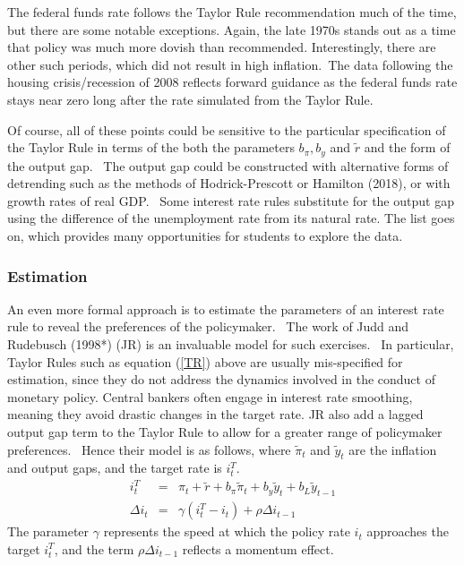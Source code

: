 \documentclass{article}
\begin{document}
\begin{doublespace}
The federal funds rate follows the Taylor Rule recommendation much of the
time, but there are some notable exceptions. Again, the late 1970s stands
out as a time that policy was much more dovish than recommended.
Interestingly, there are other such periods, which did not result in high
inflation.\ The data following the housing crisis/recession of 2008 reflects
forward guidance as the federal funds rate stays near zero long after the
rate simulated from the Taylor Rule. \ 

Of course, all of these points could be sensitive to the particular
specification of the Taylor Rule in terms of the both the parameters $b_{\pi
},b_{y}$ and $\widetilde{r}$ and the form of the output gap. \ The output
gap could be constructed with alternative forms of detrending such as the
methods of Hodrick-Prescott or Hamilton (2018), or with growth rates of real
GDP. \ Some interest rate rules substitute for the output gap using the
difference of the unemployment rate from its natural rate. The list goes on,
which provides many opportunities for students to explore the data.

\subsubsection{Estimation}

An even more formal approach is to estimate the parameters of an interest
rate rule to reveal the preferences of the policymaker. \ The work of Judd
and Rudebusch (1998*) (JR) is an invaluable model for such exercises. \ In
particular, Taylor Rules such as equation (\ref{TR}) above are usually
mis-specified for estimation, since they do not address the dynamics
involved in the conduct of monetary policy. Central bankers often engage in
interest rate smoothing, meaning they avoid drastic changes in the target
rate. JR also add a lagged output gap term to the Taylor Rule to allow for a
greater range of policymaker preferences. \ Hence their model is as follows,
where $\widetilde{\pi }_{t}$ and $\widetilde{y}_{t}$ are the inflation and
output gaps, and the target rate is $i_{t}^{T}$.%
\begin{eqnarray*}
i_{t}^{T} &=&\pi _{t}+\widetilde{r}+b_{\pi }\widetilde{\pi }_{t}+b_{y}%
\widetilde{y}_{t}+b_{L}\widetilde{y}_{t-1} \\
\Delta i_{t} &=&\gamma \left( i_{t}^{T}-i_{t}\right) +\rho \Delta i_{t-1}
\end{eqnarray*}%
The parameter $\gamma $ represents the speed at which the policy rate $i_{t}$
approaches the target $i_{t}^{T}$, and the term $\rho \Delta i_{t-1}$
reflects a momentum effect.


\end{doublespace}
\end{document}
